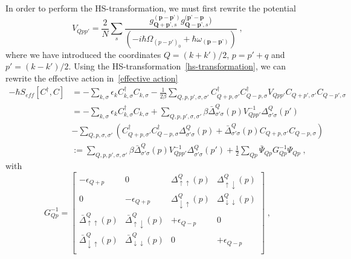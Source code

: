 \documentclass{article}
\begin{document}
In order to perform the HS-transformation, we must first rewrite the potential 
\begin{equation}
    V_{Qpp'} = \frac{2}{N} \sum_s \frac{g_{\textbf{Q} + \textbf{p'},s}^{(\textbf{p} - \textbf{p'})} g_{\textbf{Q} - \textbf{p'},s}^{(\textbf{p'} - \textbf{p}})}{\left(-i\hbar\Omega_{(p-p')_0} + \hbar \omega_{(\textbf{p} - \textbf{p'})}\right)}\;,
\end{equation}
where we have introduced the coordinates $Q = (k + k') / 2 $, $p = p' + q$ and $p' = (k - k')/2$. Using the HS-transformation~\cref{hs-transformation}, we can rewrite the effective action in~\cref{effective action}
\begin{align}
 - \hbar S_{eff}[C^{\dagger},C] &= -\sum_{k,\sigma} \epsilon_k C^{\dagger}_{k,\sigma} C_{k,\sigma} - \frac{1}{2\beta} \sum_{Q,p,p',\sigma,\sigma'} C^{\dagger}_{Q + p,\sigma'} C^{\dagger}_{Q - p,\sigma} V_{Q p p'}  C_{Q + p',\sigma'} C_{Q - p',\sigma}\label{effective action transformed}\\
                       &=  -\sum_{k,\sigma} \epsilon_k C^{\dagger}_{k,\sigma} C_{k,\sigma} +  \sum_{Q,p,p',\sigma,\sigma'} \beta \bar{\Delta}^{Q}_{\sigma' \sigma}(p) V^{-1}_{Q p p'} \Delta^{Q}_{\sigma' \sigma}(p')\nonumber\\
                       &- \sum_{Q,p,\sigma,\sigma'}\left( C^{\dagger}_{Q + p,\sigma'} C^{\dagger}_{Q - p,\sigma} \Delta^{Q}_{\sigma' \sigma}(p)+ \bar{\Delta}^{Q}_{\sigma' \sigma}(p)  C_{Q + p,\sigma'} C_{Q - p,\sigma}\right)\nonumber\\
                       &:= \sum_{Q,p,p',\sigma,\sigma'} \beta \bar{\Delta}^{Q}_{\sigma' \sigma}(p) V^{-1}_{Q p p'} \Delta^{Q}_{\sigma' \sigma}(p') + \frac{1}{2} \sum_{Q p} \bar{\Psi}_{Q p} G^{-1}_ {Q p} \Psi_{Q p}\;,
\end{align}
with 
\begin{equation}
     G_{Q p}^{-1} = 
\begin{bmatrix}
-\epsilon_{Q + p} & 0                & \Delta^{Q}_{\uparrow \uparrow}(p) & \Delta^{Q}_{\uparrow \downarrow}(p) \\
         0       & -\epsilon_{Q + p} & \Delta^{Q}_{\downarrow \uparrow}(p) & \Delta^{Q}_{\downarrow \downarrow}(p) \\
         \bar{\Delta}^{Q}_{\uparrow \uparrow}(p)       & \bar{\Delta}^{Q}_{\uparrow \downarrow}(p)                & +\epsilon_{Q-p} & 0 \\
         \bar{\Delta}^{Q}_{\downarrow \uparrow}(p)       & \bar{\Delta}^{Q}_{\downarrow \downarrow}(p)                & 0               & +\epsilon_{Q-p} \\
\end{bmatrix}\;,
\end{equation}
\end{document}
